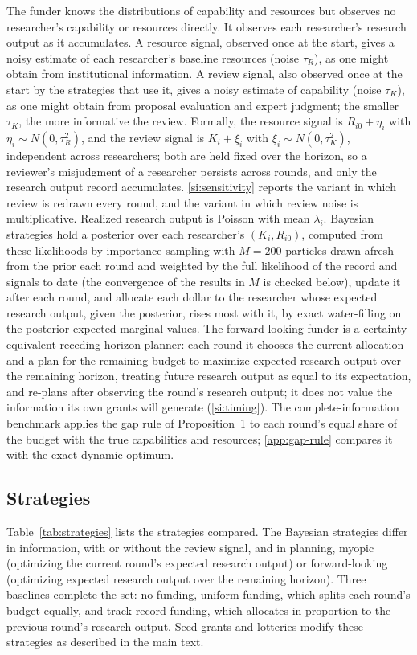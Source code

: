The funder knows the distributions of capability and resources but observes no researcher's capability or resources directly. It observes each researcher's research output as it accumulates. A resource signal, observed once at the start, gives a noisy estimate of each researcher's baseline resources (noise $\tau_R$), as one might obtain from institutional information. A review signal, also observed once at the start by the strategies that use it, gives a noisy estimate of capability (noise $\tau_K$), as one might obtain from proposal evaluation and expert judgment; the smaller $\tau_K$, the more informative the review. Formally, the resource signal is $R_{i0} + \eta_i$ with $\eta_i \sim N(0, \tau_R^2)$, and the review signal is $K_i + \xi_i$ with $\xi_i \sim N(0, \tau_K^2)$, independent across researchers; both are held fixed over the horizon, so a reviewer's misjudgment of a researcher persists across rounds, and only the research output record accumulates. \ref{si:sensitivity} reports the variant in which review is redrawn every round, and the variant in which review noise is multiplicative. Realized research output is Poisson with mean $\lambda_i$. Bayesian strategies hold a posterior over each researcher's $(K_i, R_{i0})$, computed from these likelihoods by importance sampling with $M = 200$ particles drawn afresh from the prior each round and weighted by the full likelihood of the record and signals to date (the convergence of the results in $M$ is checked below), update it after each round, and allocate each dollar to the researcher whose expected research output, given the posterior, rises most with it, by exact water-filling on the posterior expected marginal values. The forward-looking funder is a certainty-equivalent receding-horizon planner: each round it chooses the current allocation and a plan for the remaining budget to maximize expected research output over the remaining horizon, treating future research output as equal to its expectation, and re-plans after observing the round's research output; it does not value the information its own grants will generate (\ref{si:timing}). The complete-information benchmark applies the gap rule of Proposition~1 to each round's equal share of the budget with the true capabilities and resources; \ref{app:gap-rule} compares it with the exact dynamic optimum.

\subsection*{Strategies}
Table~\ref{tab:strategies} lists the strategies compared. The Bayesian strategies differ in information, with or without the review signal, and in planning, myopic (optimizing the current round's expected research output) or forward-looking (optimizing expected research output over the remaining horizon). Three baselines complete the set: no funding, uniform funding, which splits each round's budget equally, and track-record funding, which allocates in proportion to the previous round's research output. Seed grants and lotteries modify these strategies as described in the main text.

